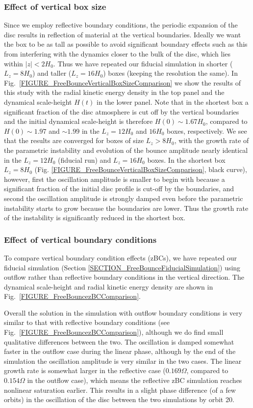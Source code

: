 \documentclass[fleqn,usenatbib]{mnras}
\begin{document}
\subsubsection{Effect of vertical box size}
Since we employ reflective boundary conditions, the periodic expansion of the disc results in reflection of material at the vertical boundaries. Ideally we want the box to be as tall as possible to avoid significant boundary effects such as this from interfering with the dynamics closer to the bulk of the disc, which lies within $|z|< 2H_0$. Thus we have repeated our fiducial simulation in shorter ($L_z = 8H_0$) and taller ($L_z = 16H_0$) boxes (keeping the resolution the same). In Fig.~\ref{FIGURE_FreeBounceVerticalBoxSizeComparison} we show the results of this study with the radial kinetic energy density in the top panel and the dynamical scale-height $H(t)$ in the lower panel. Note that in the shortest box a significant fraction of the disc atmosphere is cut off by the vertical boundaries and the initial dynamical scale-height is therefore $H(0) \sim 1.67H_0$, compared to $H(0) \sim 1.97$ and $\sim 1.99$ in the $L_z=12H_0$ and $16H_0$ boxes, respectively. We see that the results are converged for boxes of size $L_z > 8H_0$, with the growth rate of the parametric instability and evolution of the bounce amplitude nearly identical in the $L_z = 12 H_0$ (fiducial run) and $L_z = 16H_0$ boxes. In the shortest box $L_z = 8H_0$ (Fig. \ref{FIGURE_FreeBounceVerticalBoxSizeComparison}, black curve), however, first the oscillation amplitude is smaller to begin with because a significant fraction of the initial disc profile is cut-off by the boundaries, and second the oscillation amplitude is strongly damped even before the parametric instability starts to grow because the boundaries are lower. Thus the growth rate of the instability is significantly reduced in the shortest box.


\subsubsection{Effect of vertical boundary conditions}
To compare vertical boundary condition effects (zBCs), we have repeated our fiducial simulation (Section \ref{SECTION_FreeBounceFiducialSimulation}) using outflow rather than reflective boundary conditions in the vertical direction. The dynamical scale-height and radial kinetic energy density are shown in Fig.~\ref{FIGURE_FreeBouncezBCComparison}. 


Overall the solution in the simulation with outflow boundary conditions is very similar to that with reflective boundary conditions (see Fig.~\ref{FIGURE_FreeBouncezBCComparison}), although we do find small qualitative differences between the two. The oscillation is damped somewhat faster in the outflow case during the linear phase, although by the end of the simulation the oscillation amplitude is very similar in the two cases. The linear growth rate is somewhat larger in the reflective case ($0.169\Omega$, compared to $0.154\Omega$ in the outflow case), which means the reflective zBC simulation reaches nonlinear saturation earlier. This results in a slight phase difference (of a few orbits) in the oscillation of the disc between the two simulations by orbit 20.
\end{document}
